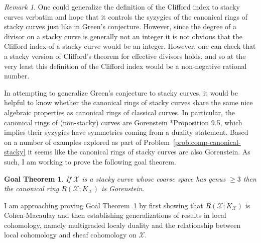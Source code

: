 \documentclass[11pt,reqno]{amsart}
\newtheorem{goalTheorem}[lemma]{Goal Theorem}
\theoremstyle{remark}
\newtheorem{remark}[lemma]{Remark}
\newtheorem{example}[lemma]{Example}
\newcommand{\cX}{\mathcal{X}}
\newcommand{\juliette}[1]{{\color{red} \sf $\spadesuit\spadesuit\spadesuit$ Juliette: [#1]}}
\begin{document}
\begin{remark}
One could generalize the definition of the Clifford index to stacky curves verbatim and hope that it controls the syzygies of the canonical rings of stacky curves just like in Green's conjecture. However, since the degree of a divisor on a stacky curve is generally not an integer it is not obvious that the Clifford index of a stacky curve would be an integer. However, one can check that a stacky version of Clifford's theorem for effective divisors holds, and so at the very least this definition of the Clifford index would be a non-negative rational number.
\end{remark}



In attempting to generalize Green's conjecture to stacky curves, it would be helpful to know whether the canonical rings of stacky curves share the same nice algebraic properties as canonical rings of classical curves. In particular, the canonical rings of (non-stacky) curves are Gorenstein \cite{eisenbud05}*{Proposition 9.5}, which implies their syzygies have symmetries coming from a duality statement. Based on a number of examples explored as part of Problem~\ref{prob:comp-canonical-stacky} it seems like the canonical rings of stacky curves are also Gorenstein. As such, I am working to prove the following goal theorem.  

\begin{goalTheorem}\label{goalThm:gorenstein}
	If $\cX$ is a stacky curve whose coarse space has genus $\geq 3$ then the canonical ring $R(\cX;K_{\cX})$ is Gorenstein. 
\end{goalTheorem}

I am approaching proving Goal Theorem~\ref{goalThm:gorenstein} by first showing that $R(\cX;K_{\cX})$ is Cohen-Macaulay and then establishing generalizations of results in local cohomology, namely multigraded localy duality and the relationship between local cohomology and sheaf cohomology on $\cX$.
\end{document}

